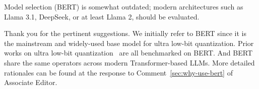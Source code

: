 \begin{revcomment}
Model selection (BERT) is somewhat outdated; modern architectures such as Llama 3.1, DeepSeek, or at least Llama 2, should be evaluated. 
\label{com:llm-accuracy}
\end{revcomment}
\begin{revresponse}[]
Thank you for the pertinent suggestions. We initially refer to BERT since it is the mainstream and widely-used base model for ultra low-bit quantization. Prior works on ultra low-bit  quantization~\cite{liu2022bit,bai2020binarybert,qin2022bibert,xing2024bipft,bebert} are all benchmarked on BERT. And BERT share the same operators across modern Transformer-based LLMs. More detailed rationales can be found at the response to Comment~\ref{sec:why-use-bert} of Associate Editor. 


\end{revresponse}
